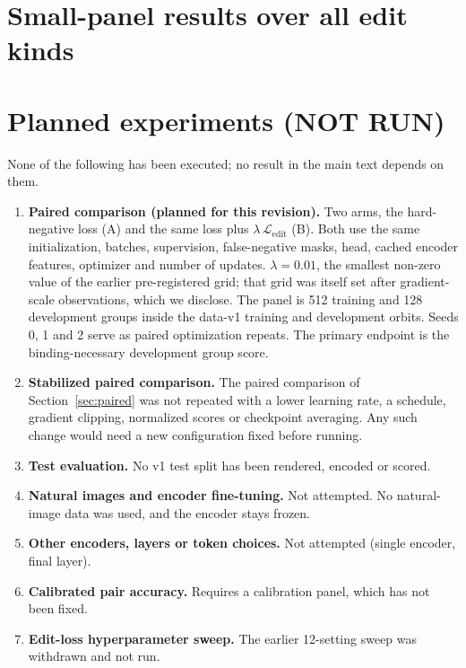 \section{Small-panel results over all edit kinds}
\label{app:full}

\begin{table}[h]
\caption{Small development panel, metrics over all four edit kinds (same run, rows and conventions
as Table~\ref{tab:small}). These include groups that a binding-blind content signal can solve.}
\centering\footnotesize

\end{table}

\section{Planned experiments (NOT RUN)}
\label{app:planned}

None of the following has been executed; no result in the main text depends on them.
\begin{enumerate}
\ifhavepaired\else
\item \textbf{Paired comparison (planned for this revision).} Two arms, the hard-negative loss (A)
and the same loss plus $\lambda\,\mathcal{L}_{\mathrm{edit}}$ (B). Both use the same
initialization, batches, supervision, false-negative masks, head, cached encoder features,
optimizer and number of updates. $\lambda=0.01$, the smallest non-zero value of the earlier
pre-registered grid; that grid was itself set after gradient-scale observations, which we
disclose. The panel is 512 training and 128 development groups inside the data-v1 training and
development orbits. Seeds 0, 1 and 2 serve as paired optimization repeats. The primary endpoint is
the binding-necessary development group score.
\fi
\ifhavepaired
\item \textbf{Stabilized paired comparison.} The paired comparison of Section~\ref{sec:paired} was
not repeated with a lower learning rate, a schedule, gradient clipping, normalized scores or
checkpoint averaging. Any such change would need a new configuration fixed before running.
\fi
\item \textbf{Test evaluation.} No v1 test split has been rendered, encoded or scored.
\item \textbf{Natural images and encoder fine-tuning.} Not attempted. No natural-image data was
used, and the encoder stays frozen.
\item \textbf{Other encoders, layers or token choices.} Not attempted (single encoder, final layer).
\item \textbf{Calibrated pair accuracy.} Requires a calibration panel, which has not been fixed.
\item \textbf{Edit-loss hyperparameter sweep.} The earlier 12-setting sweep was withdrawn and not
run.
\end{enumerate}


